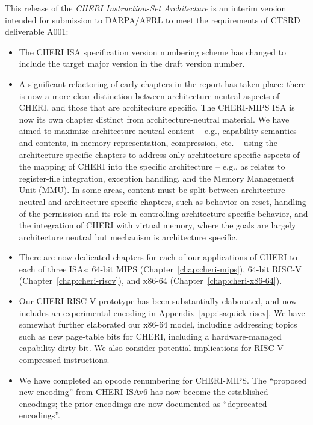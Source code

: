 This release of the \textit{CHERI Instruction-Set Architecture} is an
interim version intended for submission to DARPA/AFRL to meet the requirements
of CTSRD deliverable A001:

\begin{itemize}
\item The CHERI ISA specification version numbering scheme has changed to
include the target major version in the draft version number.

\item A significant refactoring of early chapters in the report has taken place:
there is now a more clear distinction between architecture-neutral aspects
of CHERI, and those that are architecture specific.
The CHERI-MIPS ISA is now its own chapter distinct from architecture-neutral
material.
We have aimed to maximize architecture-neutral content -- e.g., capability
semantics and contents, in-memory representation, compression, etc. -- using
the architecture-specific chapters to address only architecture-specific
aspects of the mapping of CHERI into the specific architecture -- e.g., as
relates to register-file integration, exception handling, and the Memory
Management Unit (MMU).
In some areas, content must be split between architecture-neutral and
architecture-specific chapters, such as behavior on reset, handling of the
\cappermASR permission and its role in controlling
architecture-specific behavior, and the integration of CHERI with virtual
memory, where the goals are largely architecture neutral but mechanism is
architecture specific.

\item There are now dedicated chapters for each of our applications of CHERI
to each of three ISAs: 64-bit MIPS (Chapter~\ref{chap:cheri-mips}), 64-bit
RISC-V (Chapter~\ref{chap:cheri-riscv}), and x86-64
(Chapter~\ref{chap:cheri-x86-64}).

\item Our CHERI-RISC-V prototype has been substantially elaborated, and now
includes an experimental encoding in Appendix~\ref{app:isaquick-riscv}.
We have somewhat further elaborated our x86-64 model, including addressing
topics such as new page-table bits for CHERI, including a hardware-managed
capability dirty bit.
We also consider potential implications for RISC-V compressed instructions.

\item We have completed an opcode renumbering for CHERI-MIPS.
The ``proposed new encoding'' from CHERI ISAv6 has now become the
established encodings; the prior encodings are now documented as
``deprecated encodings''.


\end{itemize}
